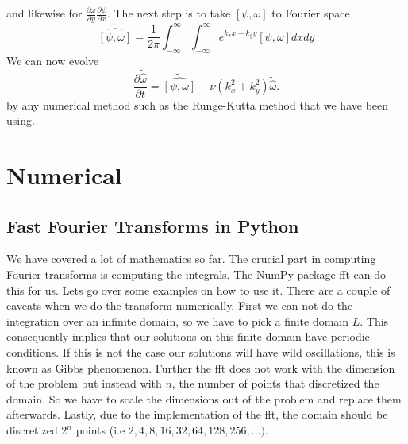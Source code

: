 \documentclass{article}
\begin{document}
and likewise for $\frac{\partial\omega}{\partial y}\frac{\partial \psi}{\partial x}$. The next step is to take $\left[\psi,\omega\right]$ to Fourier space
\begin{equation*}
\widetilde{\widehat{\left[\psi,\omega\right]}} = \frac{1}{2\pi}\int_{-\infty}^{\infty}\int_{-\infty}^{\infty}e^{k_x x+k_y y}\left[\psi,\omega\right]dxdy
\end{equation*}
We can now evolve 
\begin{equation*}
\frac{\partial \widetilde{\widehat{\omega}}}{\partial t}  = \widetilde{\widehat{\left[\psi,\omega\right]}}  - \nu (k_x^2 + k_y^2) \widetilde{\widehat{\omega}}.
\end{equation*}
by any numerical method such as the Runge-Kutta method that we have been using.

\section{Numerical}
\subsection{Fast Fourier Transforms in Python}
We have covered a lot of mathematics so far. The crucial part in computing Fourier transforms is computing the integrals. The NumPy package fft can do this for us. Lets go over some examples on how to use it. There are a couple of caveats when we do the transform numerically. First we can not do the integration over an infinite domain, so we have to pick a finite domain $L$. This consequently implies that our solutions on this finite domain have periodic conditions. If this is not the case our solutions will have wild oscillations, this is known as Gibbs phenomenon. Further the fft does not work with the dimension of the problem but instead with $n$, the number of points that discretized the domain. So we have to scale the dimensions out of the problem and replace them afterwards. Lastly, due to the implementation of the fft, the domain should be discretized $2^n$ points (i.e $2, 4, 8, 16, 32, 64, 128, 256, ...)$. 
\end{document}
